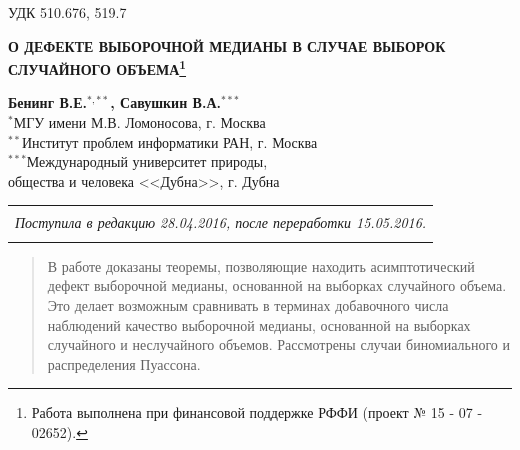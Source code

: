 \documentclass[a4paper,twoside]{article}
\theoremstyle{theorem}
\theoremstyle{remark}
\begin{document}
\pagestyle{headings}
\makeatletter
\renewcommand{\@evenhead}{\raisebox{0pt}[\headheight][0pt]{\vbox{\hbox to\textwidth{\thepage\hfill \strut {\small БЕНИНГ В.Е., САВУШКИН В.А.}}\hrule}}}
\renewcommand{\@oddhead}{\raisebox{0pt}[\headheight][0pt]{\vbox{\hbox to\textwidth{{\small О ДЕФЕКТЕ ВЫБОРОЧНОЙ МЕДИАНЫ В СЛУЧАЕ ВЫБОРОК... }\hfill \strut\thepage}\hrule}}}
\makeatother

\thispagestyle{plain}
УДК 510.676, 519.7
\begin{center}
{\bf О ДЕФЕКТЕ ВЫБОРОЧНОЙ МЕДИАНЫ В СЛУЧАЕ ВЫБОРОК СЛУЧАЙНОГО ОБЪЕМА\footnote{Работа выполнена при финансовой поддержке РФФИ (проект № 15 - 07 - 02652).}}
\vspace{4mm}\par
{\bf Бенинг В.Е.$^{*,**}$, Савушкин В.А.$^{***}$}\\
$^{*}$МГУ имени М.В. Ломоносова, г. Москва\\
$^{**}$Институт проблем информатики РАН, г. Москва\\
$^{***}$Международный университет природы,\\ общества и человека <<Дубна>>, г. Дубна 
\end{center}
\vspace{2mm}\par

\begin{center}
\renewcommand{\arraystretch}{0}
\begin{tabular}{c}
\hline
\rule{0pt}{2mm}\\
\small\it
Поступила в редакцию 28.04.2016,
после переработки 15.05.2016.
\\
\rule{0pt}{2mm}\\
\hline
\end{tabular}
\end{center}

\begin{quote}
В работе доказаны теоремы, позволяющие находить асимптотический дефект выборочной медианы, основанной на выборках случайного объема. Это делает возможным сравнивать в терминах добавочного числа наблюдений качество выборочной медианы, основанной на выборках случайного и неслучайного объемов. Рассмотрены случаи биномиального и распределения Пуассона.
\end{quote}
\end{document}

